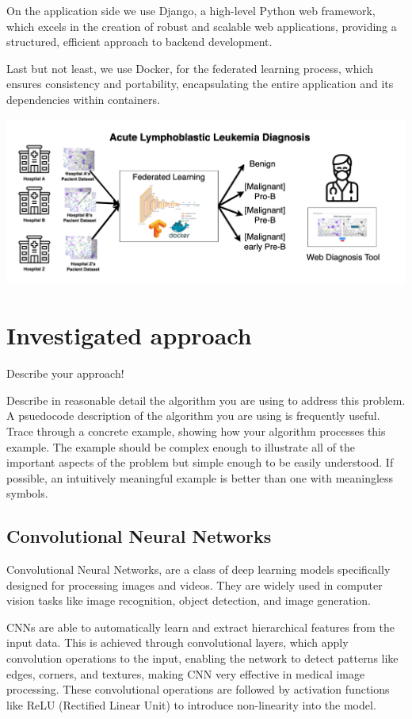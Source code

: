 \documentclass[runningheads,a4paper,11pt]{report}
\begin{document}
On the application side we use Django, a high-level Python web framework, which excels in the creation of robust and scalable web applications, providing a structured, efficient approach to backend development. 

Last but not least, we use Docker, for the federated learning process, which ensures consistency and portability, encapsulating the entire application and its dependencies within containers.

\includegraphics[scale=0.25]{images/diagram.png}


\chapter{Investigated approach}
\label{chapter:proposedApproach}

Describe your approach!

Describe in reasonable detail the algorithm you are using to address this problem. A psuedocode description of the algorithm you are using is frequently useful. Trace through a concrete example, showing how your algorithm processes this example. The example should be complex enough to illustrate all of the important aspects of the problem but simple enough to be easily understood. If possible, an intuitively meaningful example is better than one with meaningless symbols.

\section{Convolutional Neural Networks}

Convolutional Neural Networks, are a class of deep learning models specifically designed for processing images and videos. They are widely used in computer vision tasks like image recognition, object detection, and image generation. 

CNNs are able to automatically learn and extract hierarchical features from the input data. This is achieved through convolutional layers, which apply convolution operations to the input, enabling the network to detect patterns like edges, corners, and textures, making CNN very effective in medical image processing. These convolutional operations are followed by activation functions like ReLU (Rectified Linear Unit) to introduce non-linearity into the model.
\end{document}

